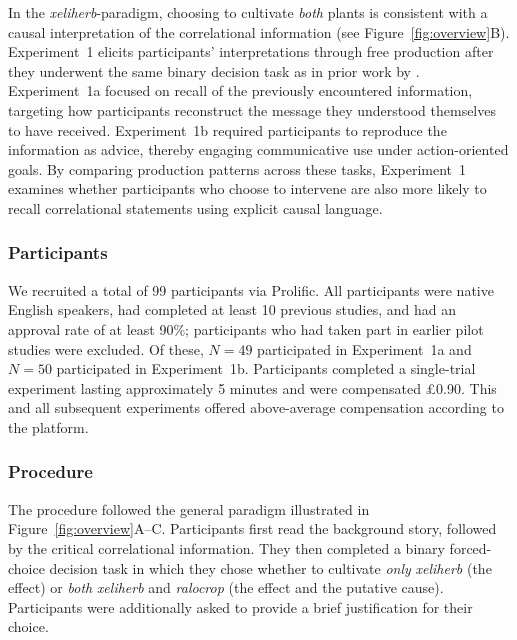 \documentclass[10pt,letterpaper]{article}
\begin{document}
In the \textit{xeliherb}-paradigm, choosing to cultivate \emph{both} plants is consistent with a causal interpretation of the correlational information (see Figure~\ref{fig:overview}B).
Experiment~1 elicits participants’ interpretations through free production after they underwent the same binary decision task as in prior work by \citet{lassiter2024rationality}.
Experiment~1a focused on recall of the previously encountered information, targeting how participants reconstruct the message they understood themselves to have received. 
Experiment~1b required participants to reproduce the information as advice, thereby engaging communicative use under action-oriented goals. By comparing production patterns across these tasks, Experiment~1 examines whether participants who choose to intervene are also more likely to recall correlational statements using explicit causal language. %

\vspace{-.1in}

\subsubsection{Participants}

We recruited a total of 99 participants via Prolific. All participants were native English speakers, had completed at least 10 previous studies, and had an approval rate of at least 90\%; participants who had taken part in earlier pilot studies were excluded. Of these, $N = 49$ participated in Experiment~1a and $N = 50$ participated in Experiment~1b. Participants completed a single-trial experiment lasting approximately 5 minutes and were compensated \pounds0.90. This and all subsequent experiments offered above-average compensation according to the platform.

\subsubsection{Procedure}
The procedure followed the general paradigm illustrated in Figure~\ref{fig:overview}A--C.
Participants first read the background story, followed by the critical correlational information. They then completed a binary forced-choice decision task in which they chose whether to cultivate \emph{only} \textit{xeliherb} (the effect) or \emph{both} \textit{xeliherb} and \textit{ralocrop} (the effect and the putative cause). Participants were additionally asked to provide a brief justification for their choice.
\end{document}
